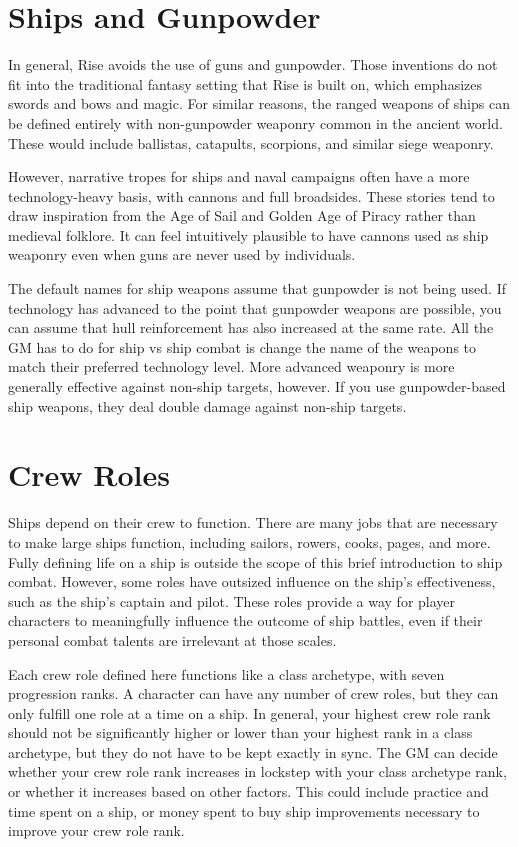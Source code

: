 \section{Ships and Gunpowder}
    In general, Rise avoids the use of guns and gunpowder.
    Those inventions do not fit into the traditional fantasy setting that Rise is built on, which emphasizes swords and bows and magic.
    For similar reasons, the ranged weapons of ships can be defined entirely with non-gunpowder weaponry common in the ancient world.
    These would include ballistas, catapults, scorpions, and similar siege weaponry.

    However, narrative tropes for ships and naval campaigns often have a more technology-heavy basis, with cannons and full broadsides.
    These stories tend to draw inspiration from the Age of Sail and Golden Age of Piracy rather than medieval folklore.
    It can feel intuitively plausible to have cannons used as ship weaponry even when guns are never used by individuals.

    The default names for ship weapons assume that gunpowder is not being used.
    If technology has advanced to the point that gunpowder weapons are possible, you can assume that hull reinforcement has also increased at the same rate.
    All the GM has to do for ship vs ship combat is change the name of the weapons to match their preferred technology level.
    More advanced weaponry is more generally effective against non-ship targets, however.
    If you use gunpowder-based ship weapons, they deal double damage against non-ship targets.

\section{Crew Roles}
    Ships depend on their crew to function.
    There are many jobs that are necessary to make large ships function, including sailors, rowers, cooks, pages, and more.
    Fully defining life on a ship is outside the scope of this brief introduction to ship combat.
    However, some roles have outsized influence on the ship's effectiveness, such as the ship's captain and pilot.
    These roles provide a way for player characters to meaningfully influence the outcome of ship battles, even if their personal combat talents are irrelevant at those scales.

    Each crew role defined here functions like a class archetype, with seven progression ranks.
    A character can have any number of crew roles, but they can only fulfill one role at a time on a ship.
    In general, your highest crew role rank should not be significantly higher or lower than your highest rank in a class archetype, but they do not have to be kept exactly in sync.
    The GM can decide whether your crew role rank increases in lockstep with your class archetype rank, or whether it increases based on other factors.
    This could include practice and time spent on a ship, or money spent to buy ship improvements necessary to improve your crew role rank.

